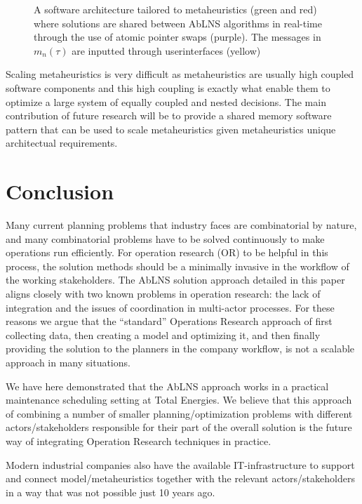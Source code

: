 \begin{figure}
	
	\drawModelSetupHexagon[simplified=true]
	\caption{A software architecture tailored to metaheuristics (green and red)
		where solutions are shared between AbLNS algorithms in real-time through the
		use of atomic pointer swaps (purple). The messages in $m_{n}^{}(\tau)$ are
		inputted through userinterfaces (yellow)
	}\label{fig:discussion:hexagon-setup}
\end{figure}

Scaling metaheuristics is very difficult as metaheuristics are usually high coupled
software components and this high coupling is exactly what enable them to optimize
a large system of equally coupled and nested decisions. The main contribution of 
future research will be to provide a shared memory software pattern that can be 
used to scale metaheuristics given metaheuristics unique architectual requirements.

\section{Conclusion}
Many current planning problems that industry faces are combinatorial by
nature, and many combinatorial problems have to be solved continuously to
make operations run efficiently. For operation research (OR) to be helpful
in this process, the solution methods should be a minimally invasive in the
workflow of the working stakeholders. The AbLNS solution approach detailed in
this paper aligns closely with two known problems in operation research: the
lack of integration and the issues of coordination in multi-actor processes.
For these reasons we argue that the ``standard'' Operations Research approach
of first collecting data, then creating a model and optimizing it, and then
finally providing the solution to the planners in the company workflow, is not a
scalable approach in many situations.

We have here demonstrated that the AbLNS approach works in a practical
maintenance scheduling setting at Total Energies. We believe that this approach
of combining a number of smaller planning/optimization problems with different
actors/stakeholders responsible for their part of the overall solution is the
future way of integrating Operation Research techniques in practice.

Modern industrial companies also have the available IT-infrastructure to support
and connect model/metaheuristics together with the relevant actors/stakeholders
in a way that was not possible just 10 years ago.

